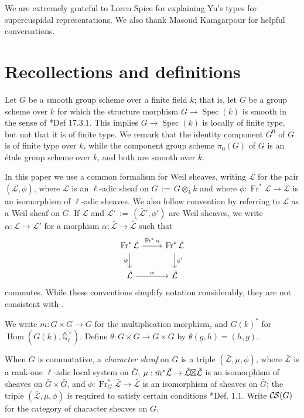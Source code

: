 \documentclass[10pt]{amsart}
\theoremstyle{plain}
\theoremstyle{definition}
\newcommand{\EE}{\mathbb{\bar Q}_\ell}
\newcommand{\bFq}{\bar{k}}
\newcommand{\Fq}{k}
\newcommand{\EEx}{\EE^\times}
\newcommand{\Frob}[1]{\operatorname{Fr}_{#1}}
\DeclareMathOperator{\Hom}{Hom}
\newcommand{\Spec}[1]{{\operatorname{Spec}(#1)}}
\newcommand{\ceq}{{\, :=\, }}
\newcommand{\cs}[1]{{\mathcal{#1}}}
\newcommand{\gcs}[1]{{\mathcal{\bar #1}}}
\newcommand{\CS}{{\mathcal{C\hskip-0.8pt S}}}
\newcommand{\bm}{\bar{m}}
\newcommand{\bG}{\bar{G}}
\newcommand{\tight}[3]{\hspace{-#1pt}{#2}\hspace{-#3pt}}
\newcommand{\LxL}{\text{$\gcs{L} \tight{0}{\boxtimes}{0} \gcs{L}$}}
\begin{document}
\bigskip

We are extremely grateful to Loren Spice for explaining Yu's types for supercuspidal representations.
We also thank Masoud Kamgarpour for helpful conversations.

\section{Recollections and definitions} \label{sec:defs}

Let $G$ be a smooth group scheme over a finite field $\Fq$; that is, let $G$ be a group scheme over $\Fq$
for which the structure morphism $G \to \Spec{\Fq}$ is smooth in the sense of \cite{EGAIV4}*{Def 17.3.1}.
This implies $G \to \Spec{\Fq}$ is locally of finite type, but not that it is of finite type.
We remark that the identity component $G^0$ of $G$ is of finite type over $\Fq$, while the component group scheme
$\pi_0(G)$ of $G$ is an \'etale group scheme over $\Fq$, and both are smooth over $\Fq$.

In this paper we use a common formalism for Weil sheaves, writing $\cs{L}$ for the pair $(\gcs{L},\phi)$, where $\gcs{L}$ is an $\ell$-adic sheaf on $\bG \ceq G\otimes_{\Fq} \bFq$ and where $\phi : \Frob{}^*\gcs{L} \to \gcs{L}$ is an isomorphism of $\ell$-adic sheaves. 
We also follow convention by referring to $\cs{L}$  as a Weil sheaf on $G$. 
If $\cs{L}$ and $\cs{L}' \ceq (\gcs{L}', \phi')$ are Weil sheaves, we write $\alpha : \cs{L} \to \cs{L}'$ for a morphism $\alpha : \gcs{L} \to \gcs{L}$ such that 
\[
\begin{tikzcd}
\Frob{}^* \gcs{L} \arrow{d}[swap]{\phi} \arrow{r}{\Frob{}^*\alpha} &  \Frob{}^* \gcs{L} \arrow{d}{\phi'}\\
\gcs{L} \arrow{r}{\alpha} & \gcs{L}
\end{tikzcd}
\]
commutes.  While these conventions simplify notation considerably, they are not consistent with \cite{cunningham-roe:13a}.

We write $m : G \times G \to G$ for the multiplication morphism, and $G(k)^*$ for $\Hom(G(k), \EEx)$.
Define $\theta : G\times G \to G\times G$ by $\theta(g,h) = (h,g)$.

When $G$ is commutative, a \emph{character sheaf} on $G$ is a triple $(\gcs{L}, \mu, \phi)$,
where $\gcs{L}$ is a rank-one $\ell$-adic local system on $\bG$, 
$\mu : \bm^* \gcs{L} \to \LxL$ is an isomorphism
of sheaves on $\bG \times \bG$, 
and $\phi : \Frob{G}^* \gcs{L} \to \gcs{L}$ is an isomorphism of sheaves on $\bG$;
the triple $(\gcs{L}, \mu, \phi)$ is required to satisfy certain conditions \cite{cunningham-roe:13a}*{Def. 1.1}.
Write $\CS(G)$ for the category of character sheaves on $G$.
\end{document}
